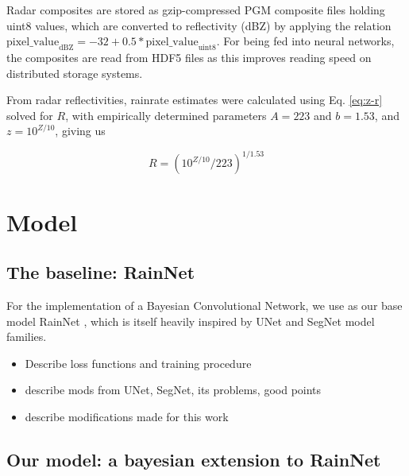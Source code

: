 

Radar composites are stored as gzip-compressed PGM composite files holding uint8 values, which are converted to reflectivity (dBZ) by applying the relation $\text{pixel\_value}_{\text{dBZ}} = -32 + 0.5 * \text{pixel\_value}_{\text{uint8}}$. For being fed into neural networks, the composites are read from HDF5 files as this improves reading speed on distributed storage systems. 


From radar reflectivities, rainrate estimates were calculated using Eq. \ref{eq:z-r} solved for $R$, with empirically determined parameters $A=223$ and $b=1.53$, and $z = 10^{Z / 10}$, giving us

\begin{equation}
R = (10^{Z / 10} / 223)^{1/1.53}
\end{equation}


 
\section{Model}

\subsection{The baseline: RainNet}

For the implementation of a Bayesian Convolutional Network, we use as our base model RainNet \cite{ayzel_rainnet_nodate}, which is itself heavily inspired by UNet and SegNet model families. 


\begin{itemize}
	\item Describe loss functions and training procedure
	\item describe mods from UNet, SegNet, its problems, good points
	\item describe modifications made for this work
\end{itemize}

\subsection{Our model: a bayesian extension to RainNet}



